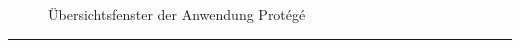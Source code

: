 \begin{figure}[H]
\centering {}
\caption{Übersichtsfenster der Anwendung Protégé\label{fig:protege}\protect\footnotemark}
\end{figure}


\vspace{0.1pt}
\noindent\rule[1ex]{\textwidth}{1pt}




